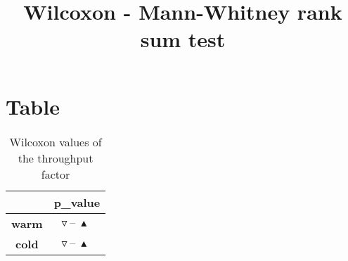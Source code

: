 \documentclass{article}
\title{Wilcoxon - Mann-Whitney rank sum test}
\author{}
\begin{document}
\maketitle
\section{Table}
\begin{table}[!htp]
  \caption{Wilcoxon values of the throughput factor}
  \label{table:throughput}
  \centering
  \begin{scriptsize}
  \begin{tabular}{c|c}
      & \textbf{p\_value} \\\hline
      \textbf{warm} & $\triangledown\ \text{--}\ \blacktriangle\ $ \\
      \textbf{cold} & $\triangledown\ \text{--}\ \blacktriangle\ $ \\
  \end{tabular}
  \end{scriptsize}
\end{table}
\end{document}
